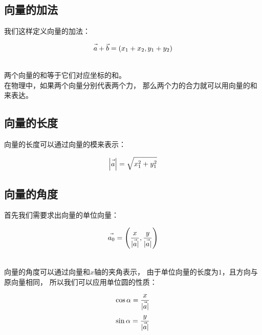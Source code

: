 \documentclass[UTF8]{ctexart}
\let\nvec\vec
\def\vec#1{\nvec{\vphantom b\smash{#1}}}
\begin{document}
\subsection{向量的加法}
    我们这样定义向量的加法：
    \begin{large}
    \begin{equation*}
        \vec{a}+\vec{b}=\left(x_1+x_2,y_1+y_2\right)
    \end{equation*}
    \end{large}\\
    两个向量的和等于它们对应坐标的和。\\[3mm]
    在物理中，如果两个向量分别代表两个力，
    那么两个力的合力就可以用向量的和来表达。

\newpage

\subsection{向量的长度}
    向量的长度可以通过向量的模来表示：\vspace{5pt}
    \begin{large}
    \begin{equation*}
        \left|\vec a\right|=\sqrt{x_1^2+y_1^2}
    \end{equation*}
    \end{large}

\subsection{向量的角度}
    首先我们需要求出向量的单位向量：\vspace{5pt}
    \begin{large}
    \begin{equation*}
        \vec{a_0}=\left(\frac{x}{|\vec a|},\frac{y}{|\vec a|}\right)
    \end{equation*}
    \end{large}\\
    向量的角度可以通过向量和$x$轴的夹角表示，
    由于单位向量的长度为$1$，且方向与原向量相同，
    所以我们可以应用单位圆的性质：
    \begin{large}
    \begin{equation*}
        \cos{\alpha}=\frac{x}{|\vec a|}
    \end{equation*}
    \begin{equation*}
        \sin{\alpha}=\frac{y}{|\vec a|}
    \end{equation*}
    \end{large}
\end{document}
